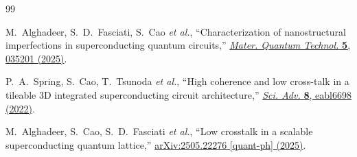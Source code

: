 \documentclass[reprint, floatfix, superscriptaddress, amsmath, amssymb, longbibliography]{revtex4-2}
\begin{document}
\begin{thebibliography}{99}



M.~Alghadeer, S.~D.~Fasciati, S.~Cao \emph{et al.},
``Characterization of nanostructural imperfections in superconducting quantum circuits,''
\href{https://doi.org/10.1088/2633-4356/aded66}
{\emph{Mater. Quantum Technol.} \textbf{5}, 035201 (2025)}.

P.~A.~Spring, S.~Cao, T.~Tsunoda \emph{et al.}, ``High coherence and low cross-talk in a tileable 3D integrated superconducting circuit architecture,'' 
\href{https://doi.org/10.1126/sciadv.abl6698}{\emph{Sci. Adv.} \textbf{8}, eabl6698 (2022)}.

M.~Alghadeer, S.~Cao, S.~D.~Fasciati \emph{et al.},
``Low crosstalk in a scalable superconducting quantum lattice,''
\href{https://arxiv.org/abs/2505.22276}
{arXiv:2505.22276 [quant-ph] (2025)}.


\end{thebibliography}
\end{document}
